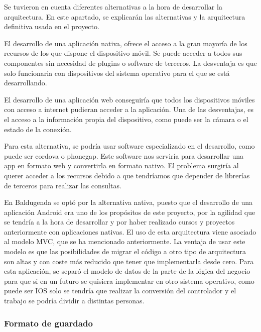 Se tuvieron en cuenta diferentes alternativas a la hora de desarrollar la arquitectura. En este apartado, se explicarán las alternativas y la arquitectura definitiva usada en el proyecto.


El desarrollo de una aplicación nativa, ofrece el acceso a la gran mayoría de los recursos de los que dispone el dispositivo móvil.
Se puede acceder a todos sus componentes sin necesidad de plugins o software de terceros.
La desventaja es que solo funcionaria con dispositivos del sistema operativo para el que se está desarrollando.


El desarrollo de una aplicación web conseguiría que todos los dispositivos móviles con acceso a internet pudieran acceder a la aplicación.
Una de las desventajas, es el acceso a la información propia del dispositivo, como puede ser la cámara o el estado de la conexión.

Para esta alternativa, se podría usar software especializado en el desarrollo, como puede ser cordova o phonegap. Este software nos serviría para desarrollar una app en formato web y convertirla en formato nativo.
El problema surgiría al querer acceder a los recursos debido a que tendríamos que depender de librerías de terceros para realizar las consultas.

En Baldugenda se optó por la alternativa nativa, puesto que el desarrollo de una aplicación Android era uno de los propósitos de este proyecto, por la agilidad que se tendría a la hora de desarrollar y por haber realizado cursos  y proyectos anteriormente con aplicaciones nativas.
El uso de esta arquitectura viene asociado al modelo MVC, que se ha mencionado anteriormente.  La ventaja de usar este modelo es que las posibilidades de migrar el código a otro tipo de arquitectura son altas y con coste más reducido que tener que implementarla desde cero.
Para esta aplicación, se separó el modelo de datos de la parte de la lógica del negocio para que si en un futuro se quisiera implementar en otro sistema operativo, como puede ser IOS solo se tendría que realizar la conversión del controlador y el trabajo se podría dividir a distintas personas.

\subsubsection{Formato de guardado}
\label{subsubsecc:formato de guardado}

